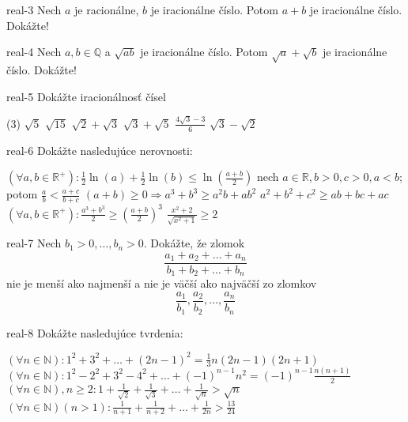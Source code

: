 \begin{defproblem}{real-3}
Nech $a$ je racionálne, $b$ je iracionálne číslo. Potom $a + b$ je
iracionálne číslo. Dokážte!
\end{defproblem}

\begin{defproblem}{real-4}
Nech $a, b \in \mathbb{Q}$ a $\sqrt{ab}$ je iracionálne číslo. Potom
$\sqrt{a} + \sqrt{b}$ je iracionálne číslo. Dokážte!
\end{defproblem}

\begin{defproblem}{real-5}
Dokážte iracionálnosť čísel
\begin{tasks}(3)
  \task $\sqrt{5}$
  \task $\sqrt{15}$
  \task $\sqrt{2} + \sqrt{3}$
  \task $\sqrt{3} + \sqrt{5}$
  \task $\frac{4\sqrt{3} - 3}{6}$
  \task $\sqrt{3} - \sqrt{2}$
\end{tasks}
\end{defproblem}

\begin{defproblem}{real-6}
Dokážte nasledujúce nerovnosti:
\begin{tasks}
  \task
    $(\forall a, b \in \mathbb{R}^{+}): \frac{1}{2} \ln(a) + \frac{1}{2} \ln(b) \leq
    \ln(\frac{a+b}{2})$
  \task
    nech $a \in \mathbb{R}, b > 0, c > 0, a < b$; potom  $\frac{a}{b} < \frac{a
    + c}{b + c}$
  \task
    $(a + b) \geq 0 \Rightarrow a^3 + b^3 \geq a^2 b + ab^2$
  \task
    $a^2 + b^2 + c^2 \geq ab + bc + ac$
  \task
    $(\forall a, b \in \mathbb{R}^+): \frac{a^3 + b^3}{2} \geq (\frac{a + b}{2})^3$
  \task
    $\frac{x^2 + 2}{\sqrt{x^2 + 1}} \geq 2$
\end{tasks}
\end{defproblem}

\begin{defproblem}{real-7}
Nech $b_1 > 0, \ldots, b_n > 0$. Dokážte, že zlomok
\[
  \frac{a_1 + a_2 + \ldots + a_n}{b_1 + b_2 + \ldots + b_n}
\]
nie je menší ako najmenší a nie je väčší ako najväčší zo zlomkov
\[
  \frac{a_1}{b_1}, \frac{a_2}{b_2}, \ldots, \frac{a_n}{b_n}
\]
\end{defproblem}

\begin{defproblem}{real-8}
Dokážte nasledujúce tvrdenia:
\begin{tasks}
  \task $(\forall n \in \mathbb{N}): 1^2 + 3^2 + \ldots + (2n - 1)^2 =
         \frac{1}{3} n(2n - 1)(2n + 1)$
  \task $(\forall n \in \mathbb{N}): 1^2 - 2^2 + 3^2 - 4^2 + \ldots +
         (-1)^{n-1}n^2 = (-1)^{n-1}\frac{n(n + 1)}{2}$
  \task $(\forall n \in \mathbb{N}), n \geq 2: 1 + \frac{1}{\sqrt{2}} +
         \frac{1}{\sqrt{3}} + \ldots + \frac{1}{\sqrt{n}} > \sqrt{n}$
  \task $(\forall n \in \mathbb{N})(n > 1): \frac{1}{n+1} + \frac{1}{n+2} +
         \ldots + \frac{1}{2n} > \frac{13}{24}$
\end{tasks}
\end{defproblem}

